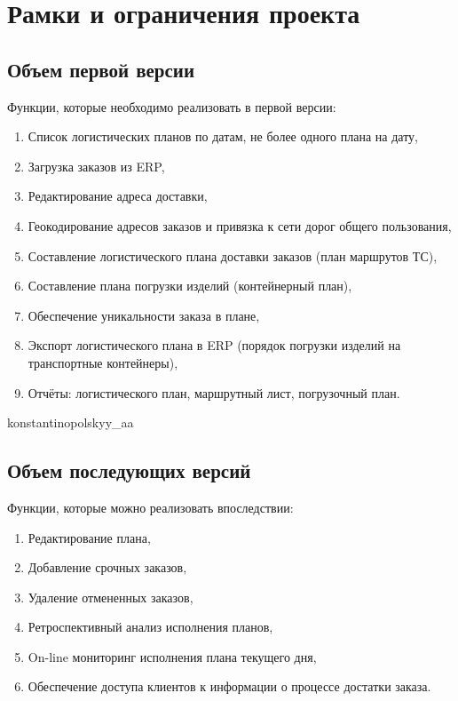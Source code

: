 \chapter{Рамки и ограничения проекта}
\label{ch:chap3}


\section{Объем первой версии}
\label{sec:mvp}

Функции, которые необходимо реализовать в первой версии:
\begin{enumerate}[label=MVP-\arabic*]
    \item Список логистических планов по датам, не более одного плана на дату,
    \item Загрузка заказов из ERP,
    \item Редактирование адреса доставки,
    \item Геокодирование адресов заказов и привязка к сети дорог общего пользования,
    \item Составление логистического плана доставки заказов (план маршрутов ТС),
    \item Составление плана погрузки изделий (контейнерный план),
    \item Обеспечение уникальности заказа в плане,
    \item Экспорт логистического плана в ERP (порядок погрузки изделий на транспортные контейнеры),
    \item Отчёты: логистического план, маршрутный лист, погрузочный план.
\end{enumerate}

konstantinopolskyy_aa

\section{Объем последующих версий}
\label{sec:next}
Функции, которые можно реализовать впоследствии:
\begin{enumerate}[label=NXT-\arabic*]
    \item Редактирование плана,
    \item Добавление срочных заказов,
    \item Удаление отмененных заказов,
    \item Ретроспективный анализ исполнения планов,
    \item On-line мониторинг исполнения плана текущего дня,
    \item Обеспечение доступа клиентов к информации о процессе достатки заказа.
\end{enumerate}


